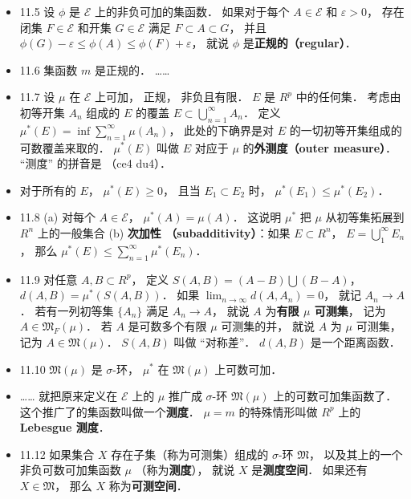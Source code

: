\begin{itemize}
\item 11.5 设 $\phi$ 是 $\mathscr E$ 上的非负可加的集函数． 如果对于每个 $A\in \mathscr E$ 和 $\varepsilon>0$， 存在闭集 $F\in \mathscr E$ 和开集 $G\in\mathscr E$ 满足 $F\subset A\subset G$， 并且 $\phi(G)-\varepsilon \leqslant \phi(A) \leqslant \phi(F) + \varepsilon$， 就说 $\phi$ 是\textbf{正规的（regular）}．

\item 11.6 集函数 $m$ 是正规的． ……

\item 11.7 设 $\mu$ 在 $\mathscr E$ 上可加， 正规， 非负且有限． $E$ 是 $R^p$ 中的任何集． 考虑由初等开集 $A_n$ 组成的 $E$ 的覆盖 $E\subset \bigcup_{n=1}^\infty A_n$． 定义 $\mu^*(E) = \inf \sum_{n=1}^\infty \mu(A_n)$， 此处的下确界是对 $E$ 的一切初等开集组成的可数覆盖来取的． $\mu^*(E)$ 叫做 $E$ 对应于 $\mu$ 的\textbf{外测度（outer measure）}． “测度” 的拼音是 （ce4 du4）．

\item 对于所有的 $E$， $\mu^*(E)\geqslant 0$， 且当 $E_1\subset E_2$ 时， $\mu^*(E_1) \leqslant \mu^*(E_2)$．

\item 11.8 (a) 对每个 $A\in \mathscr E$， $\mu^*(A)=\mu(A)$． 这说明 $\mu^*$ 把 $\mu$ 从初等集拓展到 $R^n$ 上的一般集合 (b) \textbf{次加性 （subadditivity）}：如果 $E\subset R^n$， $E=\bigcup_1^\infty E_n$， 那么 $\mu^*(E)\leqslant \sum_{n=1}^\infty \mu^*(E_n)$．

\item 11.9 对任意 $A,B \subset R^p$， 定义 $S(A,B)=(A-B)\bigcup (B-A)$， $d(A,B)=\mu^*(S(A,B))$． 如果 $\lim_{n\to\infty} d(A,A_n)=0$， 就记 $A_n\to A$． 若有一列初等集 $\{A_n\}$ 满足 $A_n\to A$， 就说 $A$ 为\textbf{有限 $\mu$ 可测集}， 记为 $A\in \mathfrak M_F(\mu)$． 若 $A$ 是可数多个有限 $\mu$ 可测集的并， 就说 $A$ 为 $\mu$ 可测集， 记为 $A\in \mathfrak M(\mu)$． $S(A,B)$ 叫做 “对称差”． $d(A,B)$ 是一个距离函数．

\item 11.10 $\mathfrak M(\mu)$ 是 $\sigma$-环， $\mu^*$ 在 $\mathfrak M(\mu)$ 上可数可加．

\item …… 就把原来定义在 $\mathscr E$ 上的 $\mu$ 推广成 $\sigma$-环 $\mathfrak M(\mu)$ 上的可数可加集函数了． 这个推广了的集函数叫做一个\textbf{测度}． $\mu=m$ 的特殊情形叫做 $R^p$ 上的 \textbf{Lebesgue 测度}．

\item 11.12 如果集合 $X$ 存在子集（称为可测集）组成的 $\sigma$-环 $\mathfrak M$， 以及其上的一个非负可数可加集函数 $\mu$ （称为\textbf{测度}）， 就说 $X$ 是\textbf{测度空间}． 如果还有 $X\in \mathfrak M$， 那么 $X$ 称为\textbf{可测空间}．


\end{itemize}
